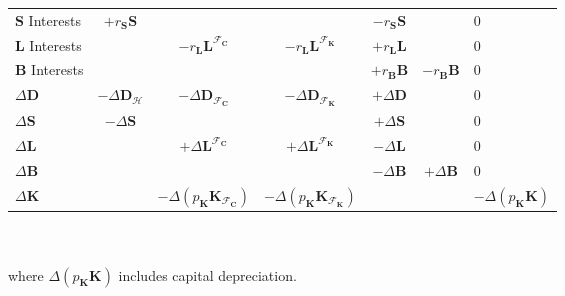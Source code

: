 \documentclass[a4paper, headings=standardclasses]{scrartcl}
\begin{document}
{\begin{tabularx}{\textwidth}{@{} Y|ccccc|l @{}}
        \midrule
        $\mathbf{S}$ Interests & $+r_{\mathbf{S}} \mathbf{S}$             &                                                            &                                                                        & $-r_{\mathbf{S}} \mathbf{S}$ &                                          & 0                                 \\
        $\mathbf{L}$ Interests &                                          & $-r_{\mathbf{L}} \mathbf{L}^{\mathcal{F}_{\mathbf{C}}}$    & $-r_{\mathbf{L}} \mathbf{L}^{\mathcal{F}_{\mathbf{K}}}$                & $+r_{\mathbf{L}} \mathbf{L}$ &                                          & 0                                 \\
        $\mathbf{B}$ Interests &                                          &                                                            &                                                                        & $+r_\mathbf{B} \mathbf{B}$   & $-r_\mathbf{B} \mathbf{B}$               & 0                                 \\
        \midrule
        $\Delta\mathbf{D}$     & $-\Delta\mathbf{D}_\mathcal{H}$          & $-\Delta\mathbf{D}_{\mathcal{F}_{\mathbf{C}}}$             & $-\Delta\mathbf{D}_{\mathcal{F}_{\mathbf{K}}}$                         & $+\Delta\mathbf{D}$          &                                          & 0                                 \\
        $\Delta\mathbf{S}$     & $-\Delta\mathbf{S}$                      &                                                            &                                                                        & $+\Delta\mathbf{S}$          &                                          & 0                                 \\
        $\Delta\mathbf{L}$     &                                          & $+\Delta\mathbf{L}^{\mathcal{F}_{\mathbf{C}}}$             & $+\Delta\mathbf{L}^{\mathcal{F}_{\mathbf{K}}}$                         & $-\Delta\mathbf{L}$          &                                          & 0                                 \\
        $\Delta\mathbf{B}$     &                                          &                                                            &                                                                        & $-\Delta\mathbf{B}$          & $+\Delta\mathbf{B}$                      & 0                                 \\
        \midrule
        $\Delta\mathbf{K}$     &                                          & $-\Delta(p_\mathbf{K}\mathbf{K}_{\mathcal{F}_\mathbf{C}})$ & $-\Delta(p_\mathbf{K}\mathbf{K}_{\mathcal{F}_\mathbf{K}})$             &                              &                                          & $-\Delta(p_\mathbf{K}\mathbf{K})$ \\
        \bottomrule
    \end{tabularx}
}\\ \\
where $\Delta(p_\mathbf{K}\mathbf{K})$ includes capital depreciation.
\end{document}

